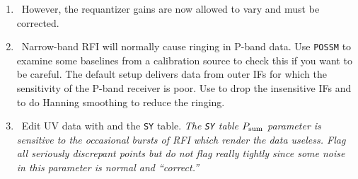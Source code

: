 \begin{enumerate}
\item\ However, the requantizer gains are now allowed to vary and must
  be corrected.

\vfill\eject
\item\ Narrow-band RFI will normally cause ringing in P-band data.
  Use {\tt POSSM} to examine some baselines from a calibration source
  to check this if you want to be careful.  The default setup delivers
  data from outer IFs for which the sensitivity of the P-band receiver
  is poor.  Use  to drop the insensitive IFs and to do
  Hanning smoothing to reduce the ringing.

\item\ Edit UV data with {\tt {}} and the {\tt SY} table.
  {\it The {\tt SY} table $P_{\rm sum}$ parameter is sensitive to the
    occasional bursts of RFI which render the data useless.  Flag all
    seriously discrepant points but do not flag really tightly since
    some noise in this parameter is normal and ``correct.''}


\end{enumerate}
